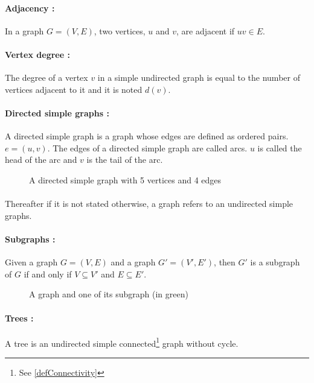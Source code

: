 \paragraph{Adjacency :}
In a graph $G=(V,E)$, two vertices, $u$ and $v$, are adjacent if $uv \in E$.

\paragraph{Vertex degree :}
The degree of a vertex $v$ in a simple undirected graph is equal to the number of
vertices adjacent to it and it is noted $d(v)$.

\paragraph{Directed simple graphs :} 
A directed simple graph is a graph whose edges are defined as ordered pairs.
$e=(u,v)$. The edges of a directed simple graph are called arcs. 
$u$ is called the head of the arc and $v$ is the tail of the arc.
\begin{figure}[!h]
  \begin{center}
    
  \end{center}
  \caption{A directed simple graph with 5 vertices and 4 edges}
\end{figure}

\paragraph{}
Thereafter if it is not stated otherwise, a graph refers to an undirected 
simple graphs.

\paragraph{Subgraphs :}
Given a graph $G = (V,E)$ and a graph $G' = (V',E')$, then $G'$ is a subgraph of $G$ 
if and only if $V \subseteq V'$ and $E \subseteq E'$.

\begin{figure}[!h]
  \begin{center}
    
  \end{center}
  \caption{A graph and one of its subgraph (in green)}
\end{figure}

\paragraph{Trees :}
A tree is an undirected simple connected\footnote{See \ref{defConnectivity}}
graph without cycle.

